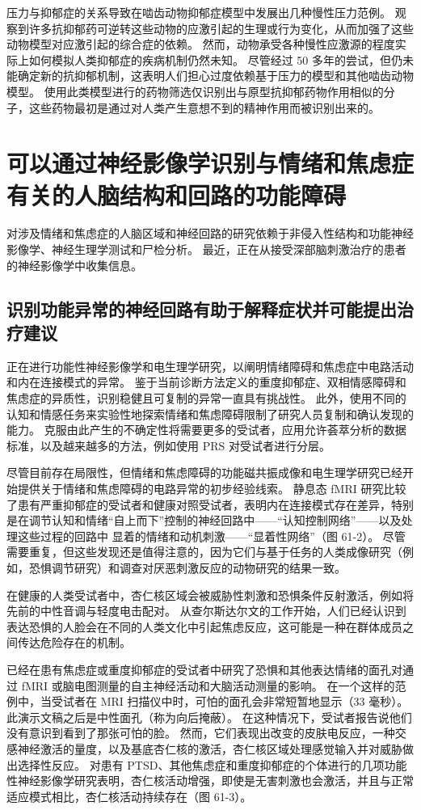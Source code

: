 压力与抑郁症的关系导致在啮齿动物抑郁症模型中发展出几种慢性压力范例。 观察到许多抗抑郁药可逆转这些动物的应激引起的生理或行为变化，从而加强了这些动物模型对应激引起的综合症的依赖。 然而，动物承受各种慢性应激源的程度实际上如何模拟人类抑郁症的疾病机制仍然未知。 尽管经过 50 多年的尝试，但仍未能确定新的抗抑郁机制，这表明人们担心过度依赖基于压力的模型和其他啮齿动物模型。 使用此类模型进行的药物筛选仅识别出与原型抗抑郁药物作用相似的分子，这些药物最初是通过对人类产生意想不到的精神作用而被识别出来的。

\section{可以通过神经影像学识别与情绪和焦虑症有关的人脑结构和回路的功能障碍}
对涉及情绪和焦虑症的人脑区域和神经回路的研究依赖于非侵入性结构和功能神经影像学、神经生理学测试和尸检分析。 最近，正在从接受深部脑刺激治疗的患者的神经影像学中收集信息。

\subsection{识别功能异常的神经回路有助于解释症状并可能提出治疗建议}
正在进行功能性神经影像学和电生理学研究，以阐明情绪障碍和焦虑症中电路活动和内在连接模式的异常。 鉴于当前诊断方法定义的重度抑郁症、双相情感障碍和焦虑症的异质性，识别稳健且可复制的异常一直具有挑战性。 此外，使用不同的认知和情感任务来实验性地探索情绪和焦虑障碍限制了研究人员复制和确认发现的能力。 克服由此产生的不确定性将需要更多的受试者，应用允许荟萃分析的数据标准，以及越来越多的方法，例如使用 PRS 对受试者进行分层。

尽管目前存在局限性，但情绪和焦虑障碍的功能磁共振成像和电生理学研究已经开始提供关于情绪和焦虑障碍的电路异常的初步经验线索。 静息态 fMRI 研究比较了患有严重抑郁症的受试者和健康对照受试者，表明内在连接模式存在差异，特别是在调节认知和情绪“自上而下”控制的神经回路中——“认知控制网络”——以及处理这些过程的回路中 显着的情绪和动机刺激——“显着性网络”（图 61-2）。 尽管需要重复，但这些发现还是值得注意的，因为它们与基于任务的人类成像研究（例如，恐惧调节研究）和调查对厌恶刺激反应的动物研究的结果一致。

在健康的人类受试者中，杏仁核区域会被威胁性刺激和恐惧条件反射激活，例如将先前的中性音调与轻度电击配对。 从查尔斯达尔文的工作开始，人们已经认识到表达恐惧的人脸会在不同的人类文化中引起焦虑反应，这可能是一种在群体成员之间传达危险存在的机制。

已经在患有焦虑症或重度抑郁症的受试者中研究了恐惧和其他表达情绪的面孔对通过 fMRI 或脑电图测量的自主神经活动和大脑活动测量的影响。 在一个这样的范例中，当受试者在 MRI 扫描仪中时，可怕的面孔会非常短暂地显示（33 毫秒）。 此演示文稿之后是中性面孔（称为向后掩蔽）。 在这种情况下，受试者报告说他们没有意识到看到了那张可怕的脸。 然而，它们表现出改变的皮肤电反应，一种交感神经激活的量度，以及基底杏仁核的激活，杏仁核区域处理感觉输入并对威胁做出选择性反应。 对患有 PTSD、其他焦虑症和重度抑郁症的个体进行的几项功能性神经影像学研究表明，杏仁核活动增强，即使是无害刺激也会激活，并且与正常适应模式相比，杏仁核活动持续存在（图 61-3）。


